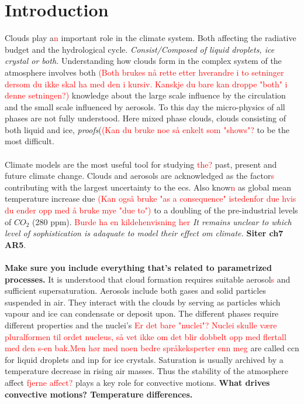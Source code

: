 \chapter{Introduction} \label{ch:introduction}
Clouds play a\textcolor{red}{n} important role in the climate system. Both affecting the radiative budget and the hydrological cycle. \textit{Consist/Composed of liquid droplets, ice crystal or both.} Understanding how clouds form in the complex system of the atmosphere involves both \textcolor{red}{(Both brukes nå rette etter hverandre i to setninger dersom du ikke skal ha med den i kursiv. Kanskje du bare kan droppe "both" i denne setningen?)} knowledge about the large scale influence by the circulation and the small scale influenced by aerosols. To this day the micro-physics of all phases are not fully understood. Here mixed phase clouds, clouds consisting of both liquid and ice, \textit{proofs}(\textcolor{red}{(Kan du bruke noe så enkelt som "shows"?} to be the most difficult. 
\\ \\ 
Climate models are the most useful tool for studying \textcolor{red}{the?} past, present and future climate change. Clouds and aerosols are acknowledged as the factor\textcolor{red}{s} contributing with the largest uncertainty to the \acrfull{ecs}. Also know\textcolor{red}{n} as global mean temperature increase due \textcolor{red}{(Kan også bruke "as a consequence" istedenfor due hvis du ender opp med å bruke mye "due to")} to a doubling of the pre-industrial levels of $CO_2$ (280 \acrshort{ppm}). \textcolor{red}{Burde ha en kildehenvisning her} \textit{It remains unclear to which level of sophistication is adaquate to model their effect om climate.} \textbf{Siter ch7 AR5}. 
\\ \\
\textbf{Make sure you include everything that's related to parametrized processes.} It is understood that cloud formation requires suitable aerosol\textcolor{red}{s} and sufficient supersaturation. Aerosols include both gases and solid particles suspended in air. They interact with the clouds by serving as particles which vapour and ice can condensate or deposit upon. The different phases require different properties and the nuclei's \textcolor{red}{Er det bare "nuclei"? Nuclei skulle være pluralformen til ordet nucleus, så vet ikke om det blir dobbelt opp med flertall med den s-en bak.Men hør med noen bedre språkeksperter enn meg} are called \acrshort{ccn} for liquid droplets and \acrshort{inp} for ice crystals. Saturation is usually archived by a temperature decrease in rising air masses. Thus the stability of the atmosphere affect \textcolor{red}{fjerne affect?} plays a key role for convective motions. \textbf{What drives convective motions? Temperature differences.}
